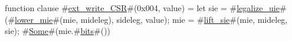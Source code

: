 function clause #\hyperref[sailRISCVzextzywritezyCSR]{ext\_write\_CSR}#(0x004, value) = { let sie = #\hyperref[sailRISCVzlegalizzezyuie]{legalize\_uie}#(#\hyperref[sailRISCVzlowerzymie]{lower\_mie}#(mie, mideleg), sideleg, value);
                                                 mie = #\hyperref[sailRISCVzliftzysie]{lift\_sie}#(mie, mideleg, sie);
                                                 #\hyperref[sailRISCVzSome]{Some}#(mie.#\hyperref[sailRISCVzbits]{bits}#()) }
